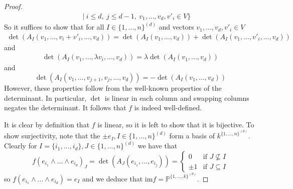 \documentclass{scrartcl}
\newcommand{\Proj}{\mathbb{P}}
\theoremstyle{definition}
\begin{document}
\begin{proof}
\begin{align*}
        &\quad | \ i \leq d, \ j \leq d - 1, \ v_1, ..., v_d, v'_i \in V\Bigr\}
    \end{align*}
    So it suffices to show that for all $I \in \{1, ..., n\}^{(d)}$ and vectors $v_1, ..., v_d, v'_i \in V$
    \begin{align*}
        \det(A_I(v_1, ..., v_i + v'_i, ..., v_d)) = \det(A_I(v_1, ..., v_d)) + \det(A_I(v_1, ..., v'_i, ..., v_d))
    \end{align*}
    and
    \begin{align*}
        \det(A_I(v_1, ..., \lambda v_i, ..., v_d)) = \lambda\det(A_I(v_1, ..., v_d))
    \end{align*}
    and
    \begin{equation*}
        \det(A_I(v_1, ..., v_{j + 1}, v_j, ..., v_d)) = -\det(A_I(v_1, ..., v_d))
    \end{equation*}
    However, these properties follow from the well-known properties of the determinant.
    In particular, $\det$ is linear in each column and swapping columns negates the determinant.
    It follows that $f$ is indeed well-defined.

    It is clear by definition that $f$ is linear, so it is left to show that it is bijective. 
    To show surjectivity, note that the $\pm e_I, I \in \{1, ..., n\}^{(d)}$ form a basis of $k^{\{1, ..., n\}^{(d)}}$.
    Clearly for $I = \{i_1, ..., i_d\}, J \in \{1, ..., n\}^{(d)}$ we have that
    \begin{equation*}
        f(e_{i_1} \wedge ... \wedge e_{i_d})_J = \det(A_J(e_{i_1}, ..., e_{i_j})) = \begin{cases}
            0 & \text{if $J \not\subseteq I$} \\
            \pm 1 & \text{if $J \subseteq I$}
        \end{cases}
    \end{equation*}
    so $f(e_{i_1} \wedge ... \wedge e_{i_d}) = e_I$ and we deduce that $\mathrm{im}f = \Proj^{\{1, ..., k\}^{(d)}}$.


\end{proof}
\end{document}
